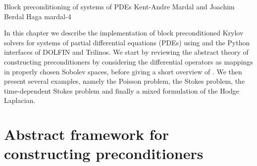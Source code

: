               {Block preconditioning of systems of PDEs}
              {Kent-Andre Mardal and Joachim Berdal Haga}
              {mardal-4}

\newcommand{\algorithmexample}[3]{%
\begin{figure*}
  \begin{center}
    \small
    \begin{tabular}{l}
      \hline
      \textbf{Algorithm example #1:} #2 \\
      \hline
      \begin{minipage}{0.9\textwidth}
        \vspace{0.1cm}
        \begin{enumerate}
          #3
        \end{enumerate}
        \vspace{0.1cm}
      \end{minipage} \\
      \hline
    \end{tabular}
    \normalsize
  \end{center}
\end{figure*}}

In this chapter we describe the implementation of block preconditioned
Krylov solvers for systems of partial differential equations (PDEs)
using  and the Python interfaces of
DOLFIN and Trilinos.  We start by reviewing the
abstract theory of constructing preconditioners
by considering the differential operators as mappings in properly
chosen Sobolev spaces, before giving a short overview
of . We then present several examples, namely the
Poisson problem, the Stokes problem, the time-dependent Stokes problem
and finally a mixed formulation of the Hodge Laplacian.

\section{Abstract framework for constructing preconditioners}

